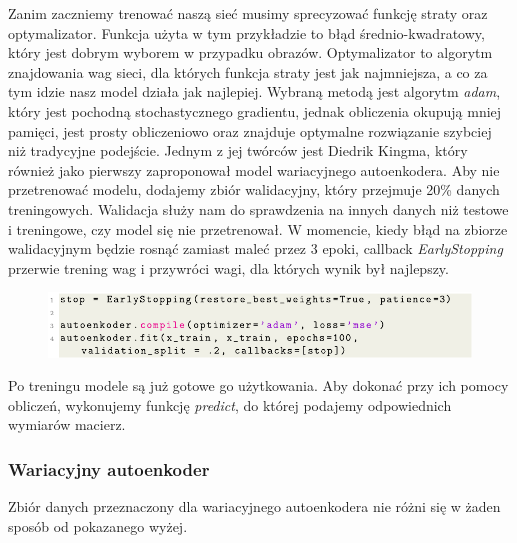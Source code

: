 \documentclass[a4paper,12pt]{book} %
\begin{document}
Zanim zaczniemy trenować naszą sieć musimy sprecyzować funkcję straty oraz optymalizator. Funkcja użyta w tym przykładzie to błąd średnio-kwadratowy, który jest dobrym wyborem w przypadku obrazów. Optymalizator to algorytm znajdowania wag sieci, dla których funkcja straty jest jak najmniejsza, a co za tym idzie nasz model działa jak najlepiej. Wybraną metodą jest algorytm \textit{adam}, który jest pochodną stochastycznego gradientu, jednak obliczenia okupują mniej pamięci, jest prosty obliczeniowo oraz znajduje optymalne rozwiązanie szybciej niż tradycyjne podejście.\cite{adam} Jednym z jej twórców jest Diedrik Kingma, który również jako pierwszy zaproponował model wariacyjnego autoenkodera. Aby nie przetrenować modelu, dodajemy zbiór walidacyjny, który przejmuje 20\% danych treningowych. Walidacja służy nam do sprawdzenia na innych danych niż testowe i treningowe, czy model się nie przetrenował. W momencie, kiedy błąd na zbiorze walidacyjnym będzie rosnąć zamiast maleć przez 3 epoki, callback \textit{EarlyStopping} przerwie trening wag i przywróci wagi, dla których wynik był najlepszy.
\begin{figure}[h!]
	\centering
	\includegraphics[width=\linewidth]{trainae.pdf}
\end{figure}

Po treningu modele są już gotowe go użytkowania. Aby dokonać przy ich pomocy obliczeń, wykonujemy funkcję \textit{predict}, do której podajemy odpowiednich wymiarów macierz. 
\subsubsection{Wariacyjny autoenkoder}
Zbiór danych przeznaczony dla wariacyjnego autoenkodera nie różni się w żaden sposób od pokazanego wyżej. 
\end{document}
